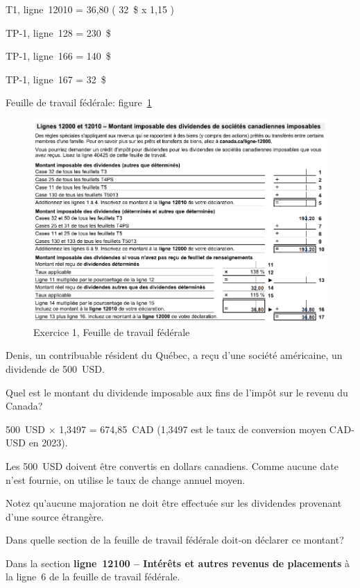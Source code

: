 T1, ligne~12010 = 36,80 ( 32~\$ x 1,15 )

TP-1, ligne~128 = 230~\$

TP-1, ligne~166 = 140~\$

TP-1, ligne~167 = 32~\$

Feuille de travail fédérale: figure~\ref{fig:chap6Exercice1FeuilleTravail}

\begin{figure}
	\centering
	\includegraphics[width=.9\textwidth]{exercice/6-1/Q2/FeuilleTravail.png}
	\caption[]{Exercice 1, Feuille de travail fédérale}
	\label{fig:chap6Exercice1FeuilleTravail}
\end{figure}

\begin{question}
	Denis, un contribuable résident du Québec, a reçu d'une société américaine, un dividende de 500~USD.
\end{question}

\setcounter{sousQuestion}{0}
\begin{sousQuestion}
	Quel est le montant du dividende imposable aux fins de l'impôt sur le revenu du Canada?
\end{sousQuestion}
500~USD $\times$ 1,3497 = 674,85~CAD (1,3497 est le taux de conversion moyen CAD-USD en 2023).

Les 500~USD doivent être convertis en dollars canadiens. Comme aucune date n'est fournie, on utilise le taux de change annuel moyen.

Notez qu'aucune majoration ne doit être effectuée sur les dividendes provenant d'une source étrangère.

\begin{sousQuestion}
	Dans quelle section de la feuille de travail fédérale doit-on déclarer ce montant?
\end{sousQuestion}
Dans la section \og \textbf{ligne~12100 – Intérêts et autres revenus de placements} \fg{} à la ligne~6 de la feuille de travail fédérale.

